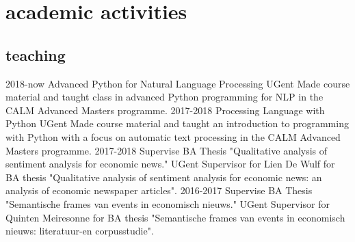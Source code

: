 \documentclass[]{friggeri-cv-a4}
\begin{document}
\section{academic activities}

\begin{refsection} %
\nocite{*}
\printbibliography[type=article, title={press \& communications}, keyword={press}, heading=bibheading]
\end{refsection}

\subsection{teaching}
\begin{entrylist}
    \entry
        {2018-now}
        {Advanced Python for Natural Language Processing}
        {UGent}
        {Made course material and taught class in advanced Python programming for NLP in the CALM Advanced Masters programme.}
    \entry
        {2017-2018}
        {Processing Language with Python}
        {UGent}
        {Made course material and taught an introduction to programming with Python with a focus on automatic text processing in the CALM Advanced Masters programme.}
    \entry
        {2017-2018}
        {Supervise BA Thesis "Qualitative analysis of sentiment analysis for economic news."}
        {UGent}
        {Supervisor for Lien De Wulf for BA thesis "Qualitative analysis of sentiment analysis for economic news: an analysis of economic newspaper articles".}
    \entry
        {2016-2017}
        {Supervise BA Thesis "Semantische frames van events in economisch nieuws."}
        {UGent}
        {Supervisor for Quinten Meiresonne for BA thesis "Semantische frames van events in economisch nieuws: literatuur-en corpusstudie".}
\end{entrylist}
\end{document}
